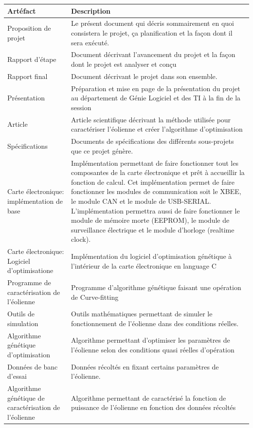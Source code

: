 \documentclass[11pt]{article}
\begin{document}
\begin{tabu} to \linewidth {X[1,l]X[2,l]}
  \bfseries Artéfact & Description \\ \hline
  Proposition de projet & Le présent document qui décris sommairement en quoi consistera le projet, ça planification et la façon dont il sera exécuté.\\ \hline
  Rapport d'étape & Document décrivant l'avancement du projet et la façon dont le projet est analyser et conçu \\ \hline
  Rapport final & Document décrivant le projet dans son ensemble.\\ \hline
  Présentation & Préparation et mise en page de la présentation du projet au département de Génie Logiciel et des TI à la fin de la session\\ \hline
  Article & Article scientifique décrivant la méthode utilisée pour caractériser l'éolienne et créer l'algorithme d'optimisation\\ \hline
  Spécifications & Documents de spécifications des différents sous-projets que ce projet génère.\\
  \hline
  Carte électronique: implémentation de base & Implémentation permettant de faire fonctionner tout les composantes de la carte électronique et prêt à accueillir la fonction de calcul. Cet implémentation permet de faire fonctionner les modules de communication soit le XBEE, le module CAN et le module de USB-SERIAL. L'implémentation permettra aussi de faire fonctionner le module de mémoire morte (EEPROM), le module de surveillance électrique et le module d'horloge (realtime clock).\\ \hline
  Carte électronique: Logiciel d'optimisatione & Implémentation du logiciel d'optimisation génétique à l'intérieur de la carte électronique en language C\\ \hline
  Programme de caractérisation de l'éolienne & Programme d'algorithme génétique faisant une opération de Curve-fitting \\ \hline
  Outils de simulation & Outils mathématiques permettant de simuler le fonctionnement de l'éolienne dans des conditions réelles. \\ \hline
  Algorithme génétique d'optimisation & Algorithme permettant d'optimiser les paramètres de l'éolienne selon des conditions quasi réelles d'opération \\ \hline
  Données de banc d'essai & Données récoltés en fixant certains paramètres de l'éolienne. \\ \hline
  Algorithme génétique de caractérisation de l'éolienne & Algorithme permettant de caractérisé la fonction de puissance de l'éolienne en fonction des données récoltés \\ \hline 
\end{tabu}
\end{document}
